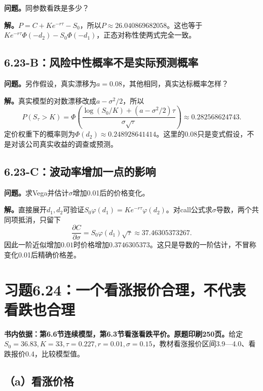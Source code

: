 \documentclass[11pt,a4paper,UTF8,fontset=fandol]{ctexart}
\begin{document}
\textbf{问题。}同参数看跌是多少？

\textbf{解。}\(P=C+Ke^{-r\tau}-S_0\)，所以\(\boxed{P\approx26.040869682058}\)。这也等于\(Ke^{-r\tau}\Phi(-d_2)-S_0\Phi(-d_1)\)，正态对称性使两式完全一致。

\subsection{6.23-B：风险中性概率不是实际预测概率}\label{bux98ceux9669ux4e2dux6027ux6982ux7387ux4e0dux662fux5b9eux9645ux9884ux6d4bux6982ux7387}

\textbf{问题。}另作假设，真实漂移为\(a=0.08\)，其他相同，真实达标概率怎样？

\textbf{解。}真实模型的对数漂移改成\(a-\sigma^2/2\)，所以
\[\boxed{P(S_\tau>K)=\Phi\left(\frac{\log(S_0/K)+(a-\sigma^2/2)\tau}{\sigma\sqrt\tau}\right)\approx0.282568624743.}\]
定价权重下的概率则为\(\Phi(d_2)\approx0.248928641414\)。这里的0.08只是变式假设，不是对该公司真实收益的调查或预测。

\subsection{6.23-C：波动率增加一点的影响}\label{cux6ce2ux52a8ux7387ux589eux52a0ux4e00ux70b9ux7684ux5f71ux54cd}

\textbf{问题。}求Vega并估计\(\sigma\)增加0.01后的价格变化。

\textbf{解。}直接展开\(d_1,d_2\)可验证\(S_0\varphi(d_1)=Ke^{-r\tau}\varphi(d_2)\)。对call公式求\(\sigma\)导数，两个共同项抵消，只留下
\[\boxed{\frac{\partial C}{\partial\sigma}=S_0\varphi(d_1)\sqrt\tau\approx37.46305373267.}\]
因此一阶近似增加\(0.01\)时价格增加\(\boxed{0.3746305373}\)。这只是导数的一阶估计，不冒称变化0.01后精确价格差。

\bigskip

\section{习题6.24：一个看涨报价合理，不代表看跌也合理}\label{ux4e60ux98986.24ux4e00ux4e2aux770bux6da8ux62a5ux4ef7ux5408ux7406ux4e0dux4ee3ux8868ux770bux8dccux4e5fux5408ux7406}

\textbf{书内依据：第6.6节连续模型，第6.3节看涨看跌平价。原题印刷250页。}给定\(S_0=36.83,K=33,\tau=0.227,r=0.01,\sigma=0.15\)，教材看涨报价区间3.9---4.0、看跌报价0.4，比较模型值。

\subsection{（a）看涨价格}\label{aux770bux6da8ux4ef7ux683c-1}
\end{document}
